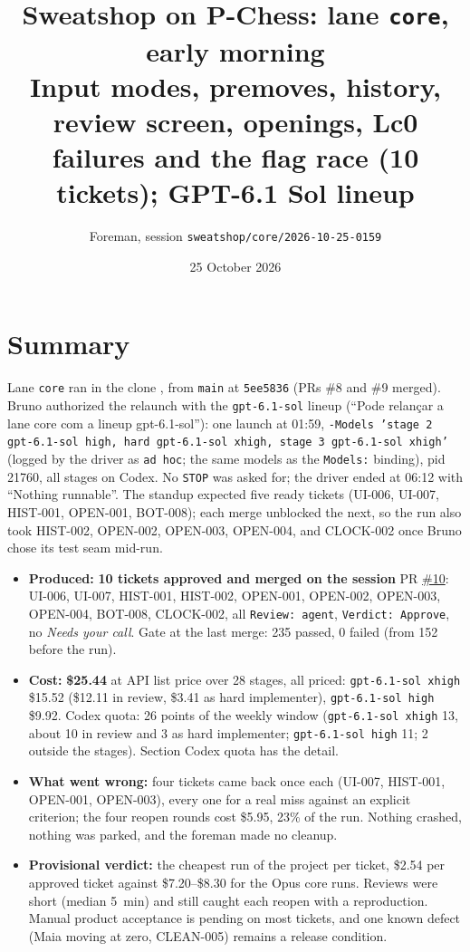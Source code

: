 \documentclass[11pt,a4paper]{article}
\title{Sweatshop on P-Chess: lane \texttt{core}, early morning\\\large Input modes, premoves, history, review screen, openings, Lc0 failures and the flag race (10 tickets); GPT-6.1 Sol lineup}
\author{Foreman, session \texttt{sweatshop/core/2026-10-25-0159}}
\date{25 October 2026}
\begin{document}
\maketitle

\section*{Summary}

Lane \texttt{core} ran in the clone , from \texttt{main} at
\texttt{5ee5836} (PRs \#8 and \#9 merged). Bruno authorized the relaunch with the
\texttt{gpt-6.1-sol} lineup (``Pode relançar a lane core com a lineup gpt-6.1-sol''): one
launch at 01:59, \texttt{-Models 'stage 2 gpt-6.1-sol high, hard gpt-6.1-sol xhigh, stage 3
gpt-6.1-sol xhigh'} (logged by the driver as \texttt{ad hoc}; the same models as the
\texttt{Models:} binding), pid 21760, all stages on Codex. No \texttt{STOP} was asked for; the
driver ended at 06:12 with ``Nothing runnable''. The standup expected five ready tickets
(UI-006, UI-007, HIST-001, OPEN-001, BOT-008); each merge unblocked the next, so the run also
took HIST-002, OPEN-002, OPEN-003, OPEN-004, and CLOCK-002 once Bruno chose its test seam
mid-run.

\begin{itemize}
  \item \textbf{Produced:} \textbf{10 tickets approved and merged on the session} PR
        \href{https://github.com/Laginho/P-Chess/pull/10}{\#10}: UI-006, UI-007, HIST-001,
        HIST-002, OPEN-001, OPEN-002, OPEN-003, OPEN-004, BOT-008, CLOCK-002, all
        \texttt{Review: agent}, \texttt{Verdict: Approve}, no \emph{Needs your call}. Gate at
        the last merge: 235 passed, 0 failed (from 152 before the run).
  \item \textbf{Cost:} \textbf{\$25.44} at API list price over 28 stages, all priced:
        \texttt{gpt-6.1-sol xhigh} \$15.52 (\$12.11 in review, \$3.41 as hard implementer),
        \texttt{gpt-6.1-sol high} \$9.92. Codex quota: 26 points of the weekly window
        (\texttt{gpt-6.1-sol xhigh} 13, about 10 in review and 3 as hard implementer;
        \texttt{gpt-6.1-sol high} 11; 2 outside the stages). Section Codex quota has the
        detail.
  \item \textbf{What went wrong:} four tickets came back once each (UI-007, HIST-001,
        OPEN-001, OPEN-003), every one for a real miss against an explicit criterion; the four
        reopen rounds cost \$5.95, 23\% of the run. Nothing crashed, nothing was parked, and the
        foreman made no cleanup.
  \item \textbf{Provisional verdict:} the cheapest run of the project per ticket, \$2.54 per
        approved ticket against \$7.20--\$8.30 for the Opus core runs. Reviews were short
        (median 5~min) and still caught each reopen with a reproduction. Manual product
        acceptance is pending on most tickets, and one known defect (Maia moving at zero,
        CLEAN-005) remains a release condition.
\end{itemize}
\end{document}

